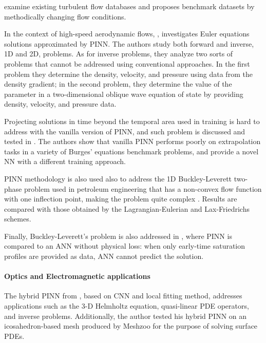 \documentclass[pdflatex,sn-basic]{sn-jnl}%
\theoremstyle{thmstyleone}%
\theoremstyle{thmstyletwo}%
\theoremstyle{thmstylethree}%
\begin{document}
\cite{Xia2020_FlowsOverPeriodic_WuXWLD} examine existing turbulent flow databases and proposes benchmark datasets by methodically changing flow conditions. 





In the context of  high-speed aerodynamic flows, 
\cite{Mao2020_PhysicsInformedNeural_JagMJK},
investigates Euler equations solutions approximated by PINN. %
The authors study both forward and inverse, 1D and 2D, problems.
As for inverse problems, they analyze two sorts of problems that cannot be addressed using conventional approaches. In the first problem they determine the density, velocity, and pressure using data from the density gradient; in the second problem, they determine the value of the parameter in a two-dimensional oblique wave equation of state by providing density, velocity, and pressure data. 


Projecting solutions in time beyond the temporal area used in training is hard to address with the vanilla version of PINN, and such problem is discussed and tested in \cite{Kim2021_DpmNovelTraining_LeeKLL}.
The authors show that vanilla PINN performs poorly on extrapolation tasks in a variety of Burges' equations benchmark problems, and provide a novel NN with a different training approach.


PINN methodology is also used also to address the 1D Buckley-Leverett two-phase problem used in petroleum engineering that has a non-convex flow function with one inflection point, making the problem quite complex \citep{Abr2021_StudyFeedforwardNeural_FloAF}. Results are compared with those obtained by the Lagrangian-Eulerian and Lax-Friedrichs schemes.

Finally, Buckley-Leverett's problem is also addressed in \cite{Alm2022_PredictionPorousMedia_AbuAA}, where PINN is compared to an ANN without physical loss:
when only early-time saturation profiles are provided as data, ANN cannot predict the solution.





\paragraph{Optics and  Electromagnetic applications}
The hybrid PINN from \cite{Fan2021_HighEfficientHybrid_Fan}, based on CNN and local fitting method, addresses applications such as the 3-D Helmholtz equation, quasi-linear PDE operators, and inverse problems.
Additionally, the author tested his hybrid PINN on an icosahedron-based mesh produced by Meshzoo for the purpose of solving surface PDEs. 
\end{document}

